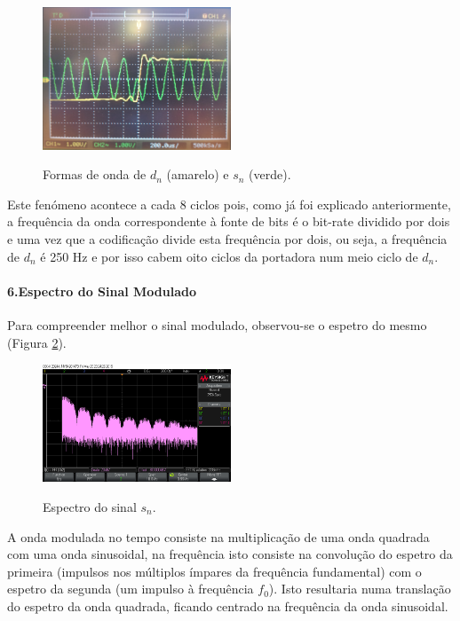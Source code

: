 \documentclass[11pt]{article}
\numberwithin{equation}{section}
\begin{document}
 
 \begin{figure}[H]
 	\centering
 	\includegraphics[width=0.5\textwidth]{./dn_mod}~\\
 	\caption{Formas de onda de $d_n$ (amarelo) e $s_n$ (verde).}
 	\label{dn_mod}
 \end{figure}
 Este fenómeno acontece a cada 8 ciclos pois, como já foi explicado anteriormente, a frequência da onda correspondente à fonte de bits é o bit-rate dividido por dois e uma vez que a codificação divide esta frequência por dois, ou seja, a frequência de $d_n$ é 250 Hz e por isso cabem oito ciclos da portadora num meio ciclo de $d_n$.
 \vspace{2 mm}

\paragraph{6.Espectro do Sinal Modulado} \hspace{0pt}
 
Para compreender melhor o sinal modulado, observou-se o espetro do mesmo (Figura \ref{espetro}).
\begin{figure}[H]
	\centering
	\includegraphics[width=0.5\textwidth]{./espetro}~\\
	\caption{Espectro do sinal $s_n$.}
	\label{espetro}
\end{figure}
A onda modulada no tempo consiste na multiplicação de uma onda quadrada com uma onda sinusoidal, na frequência isto consiste na convolução do espetro da primeira (impulsos nos múltiplos ímpares da frequência fundamental) com o espetro da segunda (um impulso à frequência $f_0$). Isto resultaria numa translação do espetro da onda quadrada, ficando centrado na frequência da onda sinusoidal.
\end{document}
